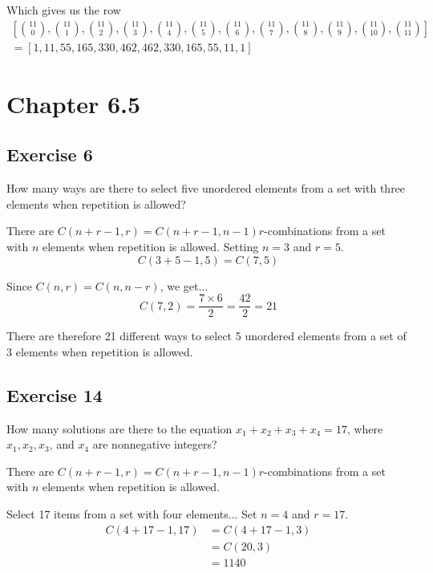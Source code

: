 \documentclass[12pt]{article}
\begin{document}
    Which gives us the row 
    \begin{equation}
        \begin{split}
            [\binom{11}{0},\binom{11}{1},\binom{11}{2},\binom{11}{3},\binom{11}{4},\binom{11}{5},\binom{11}{6},\binom{11}{7},\binom{11}{8},\binom{11}{9},\binom{11}{10},\binom{11}{11}]\\
            =[1, 11, 55, 165, 330, 462, 462, 330, 165, 55, 11, 1]   
        \end{split}
    \end{equation}
    
    \section{Chapter 6.5} 
    \subsection{Exercise 6}
    How many ways are there to select five unordered elements from a set with three elements when repetition is allowed?

    There are $C(n+r-1,r)=C(n+r-1,n-1)r$-combinations from a set with $n$ elements when repetition is allowed.
    Setting $n=3$ and $r=5$.
    \begin{equation}
            C(3+5-1,5) = C(7,5) 
    \end{equation}

    Since $C(n,r)=C(n,n-r)$, we get...
    \begin{equation}
    C(7,2) = \frac{7\times 6}{2} =\frac{42}{2} = 21
  \end{equation} 

    There are therefore 21 different ways to select 5 unordered elements from a set of 3 elements when repetition is allowed.

    \subsection{Exercise 14} 
    How many solutions are there to the equation $x_1 + x_2 + x_3 + x_4 = 17$, where $x_1,x_2,x_3$, and $x_4$ are nonnegative integers?

    There are $C(n+r-1,r)=C(n+r-1,n-1)r$-combinations from a set with $n$ elements when repetition is allowed.

    Select 17 items from a set with four elements...
    Set $n = 4$ and $r=17$.
    \begin{equation}
        \begin{split}
            C(4+17-1,17)&=C(4+17-1,3)\\
            &=C(20,3)\\
            &=1140
        \end{split}
    \end{equation}
\end{document}
